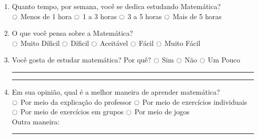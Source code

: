 \begin{enumerate}
\item Quanto tempo, por semana, você se dedica estudando Matemática? \\
$\ocircle$ Menos de 1 hora $\ocircle$ 1 a 3 horas $\ocircle$ 3 a 5 horas $\ocircle$ Mais de 5 horas

\item O que você pensa sobre a Matemática? \\
$\ocircle$ Muito Díficil $\ocircle$ Díficil $\ocircle$ Aceitável $\ocircle$ Fácil $\ocircle$ Muito Fácil

\item Você gosta de estudar matemática? Por quê? $\ocircle$ Sim $\ocircle$ Não $\ocircle$ Um Pouco \\
\noindent\rule{\textwidth}{0.4pt}
\noindent\rule{\textwidth}{0.4pt}

\item Em sua opinião, qual é a melhor maneira de aprender matemática? \\
$\ocircle$ Por meio da explicação do professor $\ocircle$ Por meio de exercícios individuais \\
$\ocircle$ Por meio de exercícios em grupos    $\ocircle$ Por meio de jogos \\
Outra maneira: \\
\noindent\rule{\textwidth}{0.4pt}

\end{enumerate}

